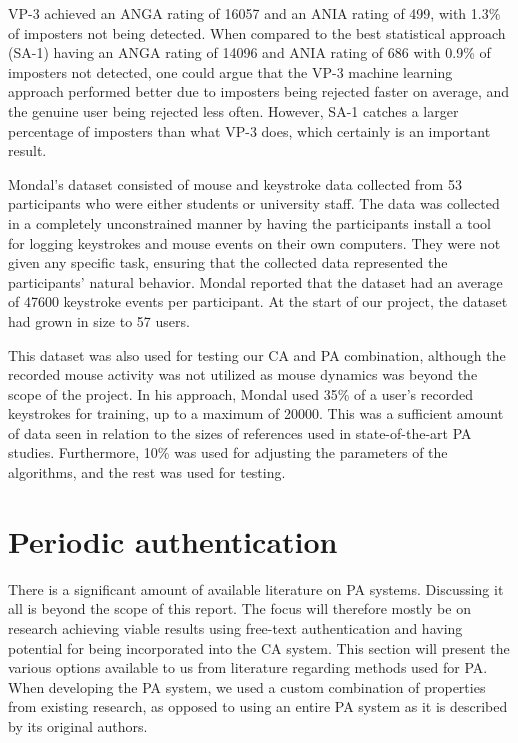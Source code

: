 VP-3 achieved an ANGA rating of 16057 and an ANIA rating of 499, with 1.3\% of imposters not being detected.
When compared to the best statistical approach (SA-1) having an ANGA rating of 14096 and ANIA rating of 686 with 0.9\% of imposters not detected, one could argue that the VP-3 machine learning approach performed better due to imposters being rejected faster on average, and the genuine user being rejected less often.
However, SA-1 catches a larger percentage of imposters than what VP-3 does, which certainly is an important result.

Mondal's dataset consisted of mouse and keystroke data collected from 53 participants who were either students or university staff.
The data was collected in a completely unconstrained manner by having the participants install a tool for logging keystrokes and mouse events on their own computers.
They were not given any specific task, ensuring that the collected data represented the participants' natural behavior.
Mondal reported that the dataset had an average of 47600 keystroke events per participant. 
At the start of our project, the dataset had grown in size to 57 users.

This dataset was also used for testing our CA and PA combination, although the recorded mouse activity was not utilized as mouse dynamics was beyond the scope of the project.
In his approach, Mondal used 35\% of a user's recorded keystrokes for training, up to a maximum of 20000.
This was a sufficient amount of data seen in relation to the sizes of references used in state-of-the-art PA studies.
Furthermore, 10\% was used for adjusting the parameters of the algorithms, and the rest was used for testing.


\section{Periodic authentication}
\label{sec:related-other}
There is a significant amount of available literature on PA systems.
Discussing it all is beyond the scope of this report. The focus will therefore mostly be on research achieving viable results using free-text authentication and having potential for being incorporated into the CA system.
This section will present the various options available to us from literature regarding methods used for PA.
When developing the PA system, we used a custom combination of properties from existing research, as opposed to using an entire PA system as it is described by its original authors.

